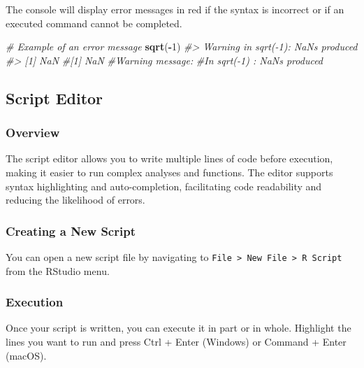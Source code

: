 \documentclass[
]{book}
\newenvironment{Shaded}{\begin{snugshade}}{\end{snugshade}}
\newcommand{\CommentTok}[1]{\textcolor[rgb]{0.56,0.35,0.01}{\textit{#1}}}
\newcommand{\DecValTok}[1]{\textcolor[rgb]{0.00,0.00,0.81}{#1}}
\newcommand{\FunctionTok}[1]{\textcolor[rgb]{0.13,0.29,0.53}{\textbf{#1}}}
\newcommand{\NormalTok}[1]{#1}
\newcommand{\SpecialCharTok}[1]{\textcolor[rgb]{0.81,0.36,0.00}{\textbf{#1}}}
\begin{document}
The console will display error messages in red if the syntax is incorrect or if an executed command cannot be completed.

\begin{Shaded}
\begin{Highlighting}[]
\CommentTok{\# Example of an error message}
\FunctionTok{sqrt}\NormalTok{(}\SpecialCharTok{{-}}\DecValTok{1}\NormalTok{)}
\CommentTok{\#\textgreater{} Warning in sqrt({-}1): NaNs produced}
\CommentTok{\#\textgreater{} [1] NaN}
\CommentTok{\#[1] NaN}
\CommentTok{\#Warning message:}
\CommentTok{\#In sqrt({-}1) : NaNs produced}
\end{Highlighting}
\end{Shaded}

\hypertarget{script-editor}{%
\subsection*{Script Editor}\label{script-editor}}

\hypertarget{overview}{%
\subsubsection*{Overview}\label{overview}}

The script editor allows you to write multiple lines of code before execution, making it easier to run complex analyses and functions. The editor supports syntax highlighting and auto-completion, facilitating code readability and reducing the likelihood of errors.

\hypertarget{creating-a-new-script}{%
\subsubsection*{Creating a New Script}\label{creating-a-new-script}}

You can open a new script file by navigating to \texttt{File\ \textgreater{}\ New\ File\ \textgreater{}\ R\ Script} from the RStudio menu.

\hypertarget{execution}{%
\subsubsection*{Execution}\label{execution}}

Once your script is written, you can execute it in part or in whole. Highlight the lines you want to run and press Ctrl + Enter (Windows) or Command + Enter (macOS).
\end{document}

